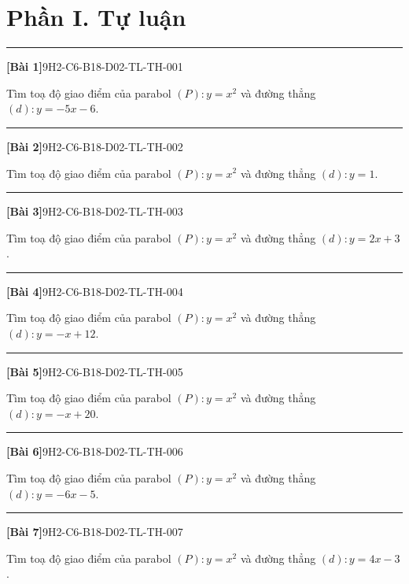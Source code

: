 \documentclass[12pt,a4paper]{article}
\newif\ifloigiai
\newenvironment{cauhoi}[2]{%
  \par\medskip\noindent\rule{\textwidth}{0.4pt}\par\nopagebreak
  \noindent\textbf{[#1]}\hfill{\scriptsize\ttfamily #2}\par\nopagebreak\smallskip}{\par}
\newcommand{\loigiai}[1]{\ifloigiai\par\smallskip\noindent\textit{Lời giải.} #1\par\fi}
\begin{document}
\section*{Phần I. Tự luận}
\begin{cauhoi}{Bài 1}{9H2-C6-B18-D02-TL-TH-001}
Tìm toạ độ giao điểm của parabol $(P): y=x^{2}$ và đường thẳng $(d): y=-5x-6$.
\loigiai{Phương trình hoành độ giao điểm: $x^{2}=-5x-6$ hay $x^{2}+5x+6=0$, có hai nghiệm $x=-3$ và $x=-2$. Giao điểm là $(-3;9)$ và $(-2;4)$.}
\end{cauhoi}
\begin{cauhoi}{Bài 2}{9H2-C6-B18-D02-TL-TH-002}
Tìm toạ độ giao điểm của parabol $(P): y=x^{2}$ và đường thẳng $(d): y=1$.
\loigiai{Phương trình hoành độ giao điểm: $x^{2}=0x+1$ hay $x^{2}+0x-1=0$, có hai nghiệm $x=-1$ và $x=1$. Giao điểm là $(-1;1)$ và $(1;1)$.}
\end{cauhoi}
\begin{cauhoi}{Bài 3}{9H2-C6-B18-D02-TL-TH-003}
Tìm toạ độ giao điểm của parabol $(P): y=x^{2}$ và đường thẳng $(d): y=2x+3$.
\loigiai{Phương trình hoành độ giao điểm: $x^{2}=2x+3$ hay $x^{2}-2x-3=0$, có hai nghiệm $x=-1$ và $x=3$. Giao điểm là $(-1;1)$ và $(3;9)$.}
\end{cauhoi}
\begin{cauhoi}{Bài 4}{9H2-C6-B18-D02-TL-TH-004}
Tìm toạ độ giao điểm của parabol $(P): y=x^{2}$ và đường thẳng $(d): y=-x+12$.
\loigiai{Phương trình hoành độ giao điểm: $x^{2}=-x+12$ hay $x^{2}+x-12=0$, có hai nghiệm $x=-4$ và $x=3$. Giao điểm là $(-4;16)$ và $(3;9)$.}
\end{cauhoi}
\begin{cauhoi}{Bài 5}{9H2-C6-B18-D02-TL-TH-005}
Tìm toạ độ giao điểm của parabol $(P): y=x^{2}$ và đường thẳng $(d): y=-x+20$.
\loigiai{Phương trình hoành độ giao điểm: $x^{2}=-x+20$ hay $x^{2}+x-20=0$, có hai nghiệm $x=-5$ và $x=4$. Giao điểm là $(-5;25)$ và $(4;16)$.}
\end{cauhoi}
\begin{cauhoi}{Bài 6}{9H2-C6-B18-D02-TL-TH-006}
Tìm toạ độ giao điểm của parabol $(P): y=x^{2}$ và đường thẳng $(d): y=-6x-5$.
\loigiai{Phương trình hoành độ giao điểm: $x^{2}=-6x-5$ hay $x^{2}+6x+5=0$, có hai nghiệm $x=-5$ và $x=-1$. Giao điểm là $(-5;25)$ và $(-1;1)$.}
\end{cauhoi}
\begin{cauhoi}{Bài 7}{9H2-C6-B18-D02-TL-TH-007}
Tìm toạ độ giao điểm của parabol $(P): y=x^{2}$ và đường thẳng $(d): y=4x-3$.
\loigiai{Phương trình hoành độ giao điểm: $x^{2}=4x-3$ hay $x^{2}-4x+3=0$, có hai nghiệm $x=1$ và $x=3$. Giao điểm là $(1;1)$ và $(3;9)$.}
\end{cauhoi}
\end{document}
